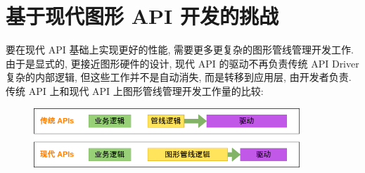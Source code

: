 \documentclass[UTF8]{ctexart}
\begin{document}
\section{基于现代图形 API 开发的挑战}
要在现代 API 基础上实现更好的性能, 需要更多更复杂的图形管线管理开发工作. 由于是显式的, 更接近图形硬件的设计, 现代 API 的驱动不再负责传统 API Driver 复杂的内部逻辑, 但这些工作并不是自动消失, 而是转移到应用层, 由开发者负责. 传统 API 上和现代 API 上图形管线管理开发工作量的比较:
\begin{figure}[h]
  \includegraphics[width=10cm]{graphics_works.png}
  \centering
\end{figure}
\end{document}
